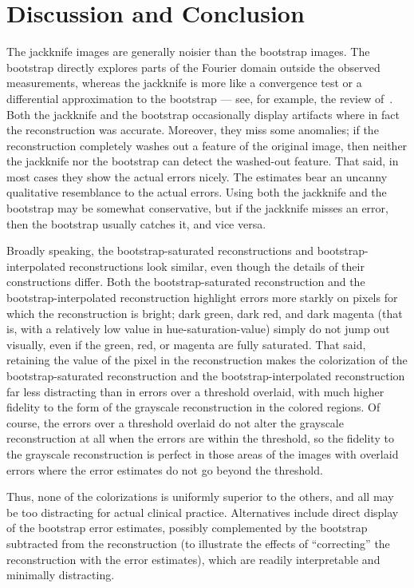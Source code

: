 \documentclass[article]{jdssv}
\begin{document}
\section{Discussion and Conclusion}
\label{conclusion}

The jackknife images are generally noisier than the bootstrap images.
The bootstrap directly explores parts of the Fourier domain
outside the observed measurements, whereas the jackknife is more
like a convergence test or a differential approximation to the bootstrap ---
see, for example, the review of~\citet{efron-tibshirani}.
Both the jackknife and the bootstrap occasionally display artifacts
where in fact the reconstruction was accurate.
Moreover, they miss some anomalies;
if the reconstruction completely washes out a feature of the original image,
then neither the jackknife nor the bootstrap can detect the washed-out feature.
That said, in most cases they show the actual errors nicely.
The estimates bear an uncanny qualitative resemblance to the actual errors.
Using both the jackknife and the bootstrap may be somewhat conservative,
but if the jackknife misses an error, then the bootstrap usually catches it,
and vice versa.

Broadly speaking, the bootstrap-saturated reconstructions
and bootstrap-interpolated reconstructions look similar,
even though the details of their constructions differ.
Both the bootstrap-saturated reconstruction and the bootstrap-interpolated
reconstruction highlight errors more starkly on pixels
for which the reconstruction is bright; dark green, dark red, and dark magenta
(that is, with a relatively low value in hue-saturation-value) simply do not
jump out visually, even if the green, red, or magenta are fully saturated.
That said, retaining the value of the pixel in the reconstruction makes
the colorization of the bootstrap-saturated reconstruction
and the bootstrap-interpolated reconstruction far less distracting
than in errors over a threshold overlaid, with much higher fidelity
to the form of the grayscale reconstruction in the colored regions.
Of course, the errors over a threshold overlaid do not alter
the grayscale reconstruction at all when the errors are within the threshold,
so the fidelity to the grayscale reconstruction is perfect
in those areas of the images with overlaid errors where the error estimates
do not go beyond the threshold.

Thus, none of the colorizations is uniformly superior to the others,
and all may be too distracting for actual clinical practice.
Alternatives include direct display of the bootstrap error estimates,
possibly complemented by the bootstrap subtracted from the reconstruction
(to illustrate the effects of ``correcting'' the reconstruction
with the error estimates), which are readily interpretable
and minimally distracting.
\end{document}
